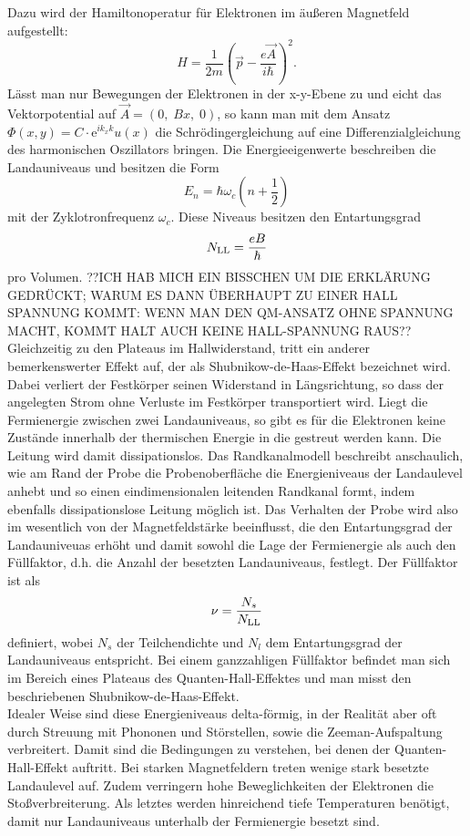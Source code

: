 \documentclass[paper=a4,fontsize=10pt,DIV=18,twocolumn,parskip=half]{scrartcl}
\numberwithin{equation}{section}    %
\begin{document}
Dazu wird der Hamiltonoperatur für Elektronen im äußeren Magnetfeld aufgestellt:
\begin{equation}
H=\frac{1}{2 m} (\vec{p} - \frac{e \vec{A}}{i \hbar})^2.
\end{equation}
Lässt man nur Bewegungen der Elektronen in der x-y-Ebene zu und eicht das Vektorpotential auf  $\vec{A}= (0, \; B x, \; 0)$, so kann man mit dem Ansatz $\Phi(x,y)=C \cdot \mathrm{e}^{i k_x k} u(x)$ die Schrödingergleichung auf eine Differenzialgleichung des harmonischen Oszillators bringen.
Die Energieeigenwerte beschreiben die Landauniveaus und besitzen die Form
\begin{equation}
E_n=\hbar \omega_c (n+\frac{1}{2})
\end{equation}
mit der Zyklotronfrequenz $\omega_c$. Diese Niveaus besitzen den Entartungsgrad
\begin{equation}
N_{\rm LL}= \frac{e B}{\hbar}
\end{equation}
pro Volumen. ??ICH HAB MICH EIN BISSCHEN UM DIE ERKLÄRUNG GEDRÜCKT; WARUM ES DANN ÜBERHAUPT ZU EINER HALL SPANNUNG KOMMT: WENN MAN DEN QM-ANSATZ OHNE SPANNUNG MACHT, KOMMT HALT AUCH KEINE HALL-SPANNUNG RAUS?? \\
Gleichzeitig zu den Plateaus im Hallwiderstand, tritt ein anderer bemerkenswerter Effekt auf, der als Shubnikow-de-Haas-Effekt bezeichnet wird. Dabei verliert der Festkörper seinen Widerstand in Längsrichtung, so dass der angelegten Strom ohne Verluste im Festkörper transportiert wird. Liegt die Fermienergie zwischen zwei Landauniveaus, so gibt es für die Elektronen keine Zustände innerhalb der thermischen Energie in die gestreut werden kann. Die Leitung wird damit dissipationslos. Das Randkanalmodell beschreibt anschaulich, wie am Rand der Probe die Probenoberfläche die Energieniveaus der Landaulevel anhebt und so einen eindimensionalen leitenden Randkanal formt, indem ebenfalls dissipationslose Leitung möglich ist.
Das Verhalten der Probe wird also im wesentlich von der Magnetfeldstärke beeinflusst, die den Entartungsgrad der Landauniveuas erhöht und damit sowohl die Lage der Fermienergie als auch den Füllfaktor, d.h. die Anzahl der besetzten Landauniveaus, festlegt. Der Füllfaktor ist als
\begin{equation}
\nu=\frac{N_s}{N_{\rm LL}}
\end{equation}
definiert, wobei $N_s$ der Teilchendichte und $N_l$ dem Entartungsgrad der Landauniveaus entspricht. Bei einem ganzzahligen Füllfaktor befindet man sich im Bereich eines Plateaus des Quanten-Hall-Effektes und man misst den beschriebenen Shubnikow-de-Haas-Effekt.\\
Idealer Weise sind diese Energieniveaus delta-förmig, in der Realität aber oft durch Streuung mit Phononen und Störstellen, sowie die Zeeman-Aufspaltung verbreitert. Damit sind die Bedingungen zu verstehen, bei denen der Quanten-Hall-Effekt auftritt. Bei starken Magnetfeldern treten wenige stark besetzte Landaulevel auf. Zudem verringern hohe Beweglichkeiten der Elektronen die Stoßverbreiterung. Als letztes werden hinreichend tiefe Temperaturen benötigt, damit nur Landauniveaus unterhalb der Fermienergie besetzt sind.\\
\end{document}
